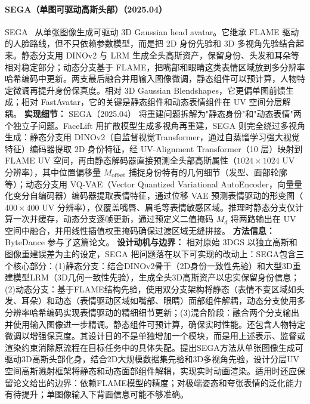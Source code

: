 \paragraph{SEGA（单图可驱动高斯头部）（2025.04）}
SEGA~\cite{2504_14373} 从单张图像生成可驱动 3D Gaussian head avatar。它继承 FLAME 驱动的人脸路线，但不只依赖参数模型，而是把 2D 身份先验和 3D 多视角先验结合起来。静态分支用 DINOv2 与 LRM 生成全头高斯资产，保留身份、头发和耳朵等相对稳定部分；动态分支基于 FLAME，把嘴部和眼睛这类表情区域放到多分辨率哈希编码中更新。两支最后融合并用输入图像微调，静态组件可以预计算，人物特定微调再提升身份保真度。相对 3D Gaussian Blendshapes，它更偏单图前馈生成；相对 FastAvatar，它的关键是静态组件和动态表情组件在 UV 空间分层解耦。
\textbf{实现细节：} SEGA（2025.04） 将重建问题拆解为"静态身份"和"动态表情"两个独立子问题。FaceLift 用扩散模型生成多视角再重建，SEGA 则完全绕过多视角生成：静态分支用 DINOv2（自监督视觉Transformer，通过自蒸馏学习强大视觉特征）编码器提取 2D 身份特征，经 UV-Alignment Transformer（10 层）映射到 FLAME UV 空间，再由静态解码器直接预测全头部高斯属性（$1024 \times 1024$ UV 分辨率），其中位置偏移量 $M_{\mathrm{offset}}$ 捕捉身份特有的几何细节（发型、面部轮廓等）；动态分支用 VQ-VAE（Vector Quantized Variational AutoEncoder，向量量化变分自编码器）编码器提取表情特征，通过位移 VAE 预测表情驱动的形变图（$400 \times 400$ UV 分辨率），仅覆盖嘴唇、眉毛等表情敏感区域。推理时静态分支仅计算一次并缓存，动态分支逐帧更新，通过预定义二值掩码 $M_d$ 将两路输出在 UV 空间中融合，并用线性插值权重掩码确保过渡区域无缝拼接。
\textbf{方法信息：} ByteDance 参与了这篇论文。
\textbf{设计动机与边界：} 相对原始 3DGS 以独立高斯和图像重建误差为主的设定，SEGA 把问题落在以下可实现的改动上：SEGA包含三个核心部分：(1)静态分支：结合DINOv2骨干（2D身份一致性先验）和大型3D重建模型LRM（3D几何一致性先验），生成全头3D高斯资产以忠实保留身份信息；(2)动态分支：基于FLAME结构先验，使用双分支架构将静态（表情不变区域如头发、耳朵）和动态（表情驱动区域如嘴部、眼睛）面部组件解耦，动态分支使用多分辨率哈希编码实现表情驱动的精细细节更新；(3)混合阶段：融合两个分支输出并使用输入图像进一步精调。静态组件可预计算，确保实时性能。还包含人物特定微调以增强保真度。其设计目的不是单独增加一个模块，而是用上述表示、监督或渲染约束消除原流程在目标任务中的具体失配。提出SEGA方法从单张图像生成可驱动3D高斯头部化身，结合2D大规模数据集先验和3D多视角先验，设计分层UV空间高斯溅射框架将静态和动态面部组件解耦，实现实时动画渲染。适用时还应保留论文给出的边界：依赖FLAME模型的精度；对极端姿态和夸张表情的泛化能力有待提升；单图像输入下背面信息可能不够准确。
